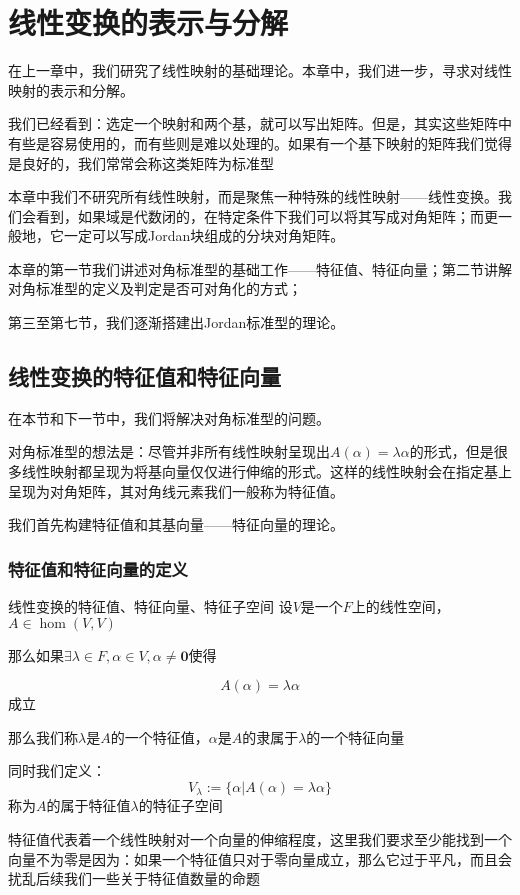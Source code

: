 \documentclass[12pt, a4paper, oneside, UTF8]{ctexbook}
\begin{document}
% 
\else
\fi
\chapter{线性变换的表示与分解}
	在上一章中，我们研究了线性映射的基础理论。本章中，我们进一步，寻求对线性映射的表示和分解。

	我们已经看到：选定一个映射和两个基，就可以写出矩阵。但是，其实这些矩阵中有些是容易使用的，而有些则是难以处理的。如果有一个基下映射的矩阵我们觉得是良好的，我们常常会称这类矩阵为标准型

	本章中我们不研究所有线性映射，而是聚焦一种特殊的线性映射——线性变换。我们会看到，如果域是代数闭的，在特定条件下我们可以将其写成对角矩阵；而更一般地，它一定可以写成Jordan块组成的分块对角矩阵。

	本章的第一节我们讲述对角标准型的基础工作——特征值、特征向量；第二节讲解对角标准型的定义及判定是否可对角化的方式；

	第三至第七节，我们逐渐搭建出Jordan标准型的理论。
	\section{线性变换的特征值和特征向量}
		在本节和下一节中，我们将解决对角标准型的问题。

		对角标准型的想法是：尽管并非所有线性映射呈现出$A(\alpha )=\lambda \alpha $的形式，但是很多线性映射都呈现为将基向量仅仅进行伸缩的形式。这样的线性映射会在指定基上呈现为对角矩阵，其对角线元素我们一般称为特征值。

		我们首先构建特征值和其基向量——特征向量的理论。
		\subsection{特征值和特征向量的定义}
			\begin{defn}{线性变换的特征值、特征向量、特征子空间}{}
				设$V$是一个$F$上的线性空间，$A \in \hom(V,V)$

				那么如果$\exists \lambda \in F,\alpha \in V,\alpha \neq \mathbf{0}$使得

				\begin{equation}
					A(\alpha )=\lambda \alpha 
				\end{equation}
				成立

				那么我们称$\lambda $是$A$的一个特征值，$\alpha $是$A$的隶属于$\lambda $的一个特征向量

				同时我们定义：
				\begin{equation}
					V_\lambda := \{\alpha | A(\alpha )=\lambda \alpha \}
				\end{equation}
				称为$A$的属于特征值$\lambda $的特征子空间
			\end{defn}
			特征值代表着一个线性映射对一个向量的伸缩程度，这里我们要求至少能找到一个向量不为零是因为：如果一个特征值只对于零向量成立，那么它过于平凡，而且会扰乱后续我们一些关于特征值数量的命题
\end{document}
